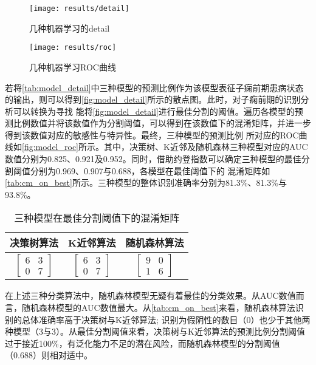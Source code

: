 \begin{figure}[htbp]
      \centering
      \texttt{[image: results/detail]}
      \caption[几种机器学习的detail]{\label{fig:model_detail}几种机器学习的detail}
\end{figure}
\begin{figure}[htbp]
      \centering
      \texttt{[image: results/roc]}
      \caption[几种机器学习ROC曲线]{\label{fig:model_roc}几种机器学习ROC曲线}
\end{figure}

若将\autoref{tab:model_detail}中三种模型的预测比例作为该模型表征子痫前期患病状态的输出，则可以得到\autoref{fig:model_detail}所示的散点图。此时，对子痫前期的识别分析可以转换为寻找
能将\autoref{fig:model_detail}进行最佳分割的阈值。遍历各模型的预测比例数值并将该数值作为分割阈值，可以得到在该数值下的混淆矩阵，并进一步得到该数值对应的敏感性与特异性。最终，三种模型的预测比例
所对应的ROC曲线如\autoref{fig:model_roc}所示。其中，决策树、K近邻及随机森林三种模型对应的AUC数值分别为0.825、0.921及0.952。同时，借助约登指数可以确定三种模型的最佳分割阈值分别为0.969、0.907与0.688，各模型在最佳阈值下的
混淆矩阵如\autoref{tab:cm_on_best}所示。三种模型的整体识别准确率分别为81.3\%、81.3\%与93.8\%。

\begin{table}[htbp]
      \centering
      \caption{\label{tab:cm_on_best}三种模型在最佳分割阈值下的混淆矩阵}
      \begin{tabular}{ccc}
      \toprule
      \textbf{决策树算法}&\textbf{K近邻算法}&\textbf{随机森林算法}\\
      \midrule
      $\left[ \begin{array}{cc} 6 & 3 \\ 0 & 7 \end{array} \right]$ & $\left[ \begin{array}{cc} 6 & 3 \\ 0 & 7 \end{array} \right]$ & $\left[ \begin{array}{cc} 9 & 0 \\ 1 & 6 \end{array} \right]$ \\
      \bottomrule
      \end{tabular}%
\end{table}%

在上述三种分类算法中，随机森林模型无疑有着最佳的分类效果。从AUC数值而言，随机森林模型的AUC数值最大。从\autoref{tab:cm_on_best}来看，随机森林算法识别的总体准确率高于决策树与K近邻算法;
识别为假阴性的数目（0）也少于其他两种模型（3与3）。从最佳分割阈值来看，决策树与K近邻算法的预测比例分割阈值过于接近100\%，有泛化能力不足的潜在风险，而随机森林模型的分割阈值（0.688）则相对适中。

